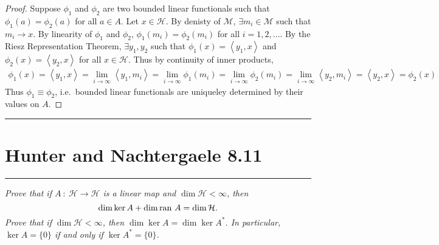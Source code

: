 \documentclass{article} %
\theoremstyle{plain}
\newcommand{\VEC}[2]{\left\langle #1, #2 \right\rangle}
\newcommand{\ran}{\text{\rm ran }}
\newcommand{\problem}[1]{
\vspace{.375cm}
\begin{minipage}{\textwidth}
    \begin{center}
        \noindent\rule{5cm}{1pt}
    \end{center}
    \section{\bf #1}
    \begin{center}
        \noindent\rule{5cm}{1pt}
    \end{center}
    \vspace{0.25cm}
\end{minipage}
}
\numberwithin{equation}{section} %
\numberwithin{figure}{section} %
\numberwithin{table}{section} %
\begin{document}
\begin{proof}
    Suppose $\phi_1$ and $\phi_2$ are two bounded linear functionals such that $\phi_1(a) = \phi_2(a)$ for all $a \in A$.  Let $x \in \mathcal{H}$.  By denisty of $\mathcal{M}$, $\exists m_i \in \mathcal{M}$ such that $m_i \rightarrow x$.  By linearity of $\phi_1$ and $\phi_2$, $\phi_1(m_i) = \phi_2(m_i)$ for all $i = 1, 2, \dots$.  By the Riesz Representation Theorem, $\exists y_1, y_2$ such that $\phi_1(x) = \VEC{y_1}{x}$ and $\phi_2(x) = \VEC{y_2}{x}$ for all $x \in \mathcal{H}$.  Thus by continuity of inner products,
    \begin{align*}
        \phi_1(x) = \VEC{y_1}{x} = \lim_{i\rightarrow \infty}\VEC{y_1}{m_i} = \lim_{i\rightarrow \infty}\phi_1(m_i) = \lim_{i \rightarrow \infty}\phi_2(m_i) = \lim_{i \rightarrow \infty}\VEC{y_2}{m_i} = \VEC{y_2}{x} = \phi_2(x)
    \end{align*}
    Thus $\phi_1 \equiv \phi_2$, i.e.~bounded linear functionals are uniqueley determined by their values on $A$.
\end{proof}










\problem{Hunter and Nachtergaele 8.11}
\emph{Prove that if $A\ :\ \mathcal{H} \rightarrow \mathcal{H}$ is a linear map and $\dim \mathcal{H} < \infty$, then $$\dim \ker A + \dim \ran A = \dim \mathcal{H}.$$  Prove that if $\dim \mathcal{H} < \infty$, then $\dim \ker A = \dim \ker A^*$.  In particular, $\ker A = \{0\}$ if and only if $\ker A^* = \{0\}$.} \\
\end{document}
